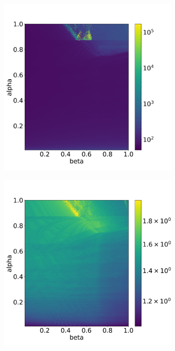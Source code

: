 \documentclass{report}
\begin{document}
\begin{figure}[H]
    \centering
    \begin{subfigure}{0.32\textwidth}
    	\centering
    	\includegraphics[width=1\textwidth]{images/analysis_BDF23_TS.png}
        \label{fig:numberTimeStepsBDF23}
    \end{subfigure}
    \begin{subfigure}{0.32\textwidth}
    	\centering
    	\includegraphics[width=1\textwidth]{images/analysis_BDF23_NI.png}

\end{subfigure}
\end{figure}
\end{document}
